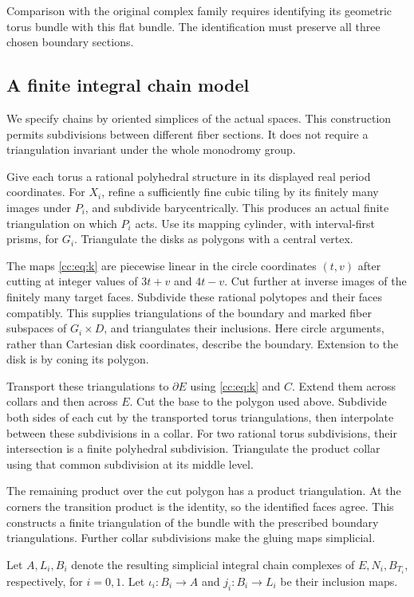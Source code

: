 Comparison with the original complex family requires identifying its
geometric torus bundle with this flat bundle.
The identification must preserve all three chosen boundary sections.

\subsection{A finite integral chain model}

We specify chains by oriented simplices of the actual spaces.
This construction permits subdivisions between different fiber sections.
It does not require a triangulation invariant under the whole monodromy group.

Give each torus a rational polyhedral structure in its displayed real
period coordinates. For $X_i$, refine a sufficiently fine cubic tiling by
its finitely many images under $P_i$, and subdivide barycentrically.
This produces an actual finite triangulation on which $P_i$ acts.
Use its mapping cylinder, with interval-first prisms, for $G_i$.
Triangulate the disks as polygons with a central vertex.

The maps \eqref{cc:eq:k} are piecewise linear in the circle coordinates
$(t,v)$ after cutting at integer values of $3t+v$ and $4t-v$.
Cut further at inverse images of the finitely many target faces.
Subdivide these rational polytopes and their faces compatibly.
This supplies triangulations of the boundary and marked fiber subspaces
of $G_i\times D$, and triangulates their inclusions.
Here circle arguments, rather than Cartesian disk coordinates, describe
the boundary. Extension to the disk is by coning its polygon.

Transport these triangulations to $\partial E$ using \eqref{cc:eq:k} and $C$.
Extend them across collars and then across $E$.
Cut the base to the polygon used above.
Subdivide both sides of each cut by the transported torus triangulations,
then interpolate between these subdivisions in a collar.
For two rational torus subdivisions, their intersection is a finite
polyhedral subdivision. Triangulate the product collar using that
common subdivision at its middle level.

The remaining product over the cut polygon has a product triangulation.
At the corners the transition product is the identity, so the
identified faces agree. This constructs a finite triangulation of the
bundle with the prescribed boundary triangulations.
Further collar subdivisions make the gluing maps simplicial.

Let $A,L_i,B_i$ denote the resulting simplicial integral chain complexes
of $E,N_i,B_{T_i}$, respectively, for $i=0,1$.
Let $\iota_i:B_i\to A$ and $j_i:B_i\to L_i$ be their inclusion maps.

